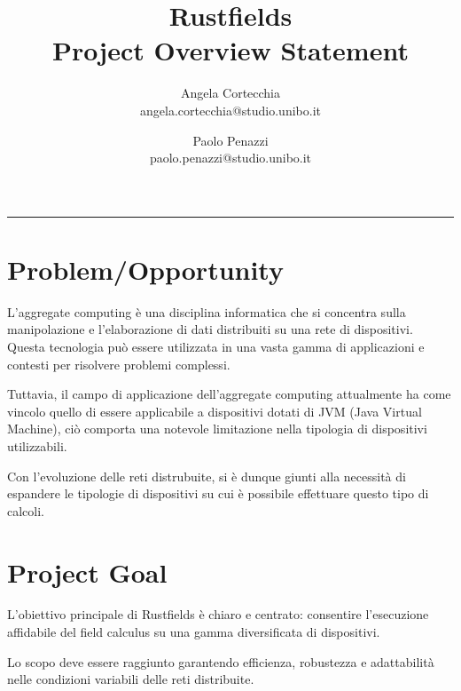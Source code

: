 \documentclass[12pt, a4paper]{article}
\title{\LARGE
    Rustfields \\ 
    \small
    Project Overview Statement
    }
\author{
    Angela Cortecchia \\ 
    \small 
    angela.cortecchia@studio.unibo.it
    \and
    Paolo Penazzi \\ 
    \small
    paolo.penazzi@studio.unibo.it
}
\date{\small }
\begin{document}
\maketitle
\par\noindent\rule{\textwidth}{0.5pt}


\section*{Problem/Opportunity}
L'aggregate computing è una disciplina informatica che si concentra sulla manipolazione e
l'elaborazione di dati distribuiti su una rete di dispositivi. Questa tecnologia può essere utilizzata in una vasta gamma
di applicazioni e contesti per risolvere problemi complessi.

Tuttavia, il campo di applicazione dell'aggregate computing attualmente ha come vincolo quello di essere applicabile a dispositivi dotati di JVM (Java Virtual Machine),
ciò comporta una notevole limitazione nella tipologia di dispositivi utilizzabili.

Con l'evoluzione delle reti distrubuite, si è dunque giunti alla necessità di espandere le tipologie di dispositivi su cui è possibile effettuare
questo tipo di calcoli.


\section*{Project Goal}
L'obiettivo principale di Rustfields è chiaro e centrato: consentire l'esecuzione affidabile del field calculus su una gamma diversificata di dispositivi.

Lo scopo deve essere raggiunto garantendo efficienza, robustezza e adattabilità nelle condizioni variabili delle reti distribuite.
\end{document}
